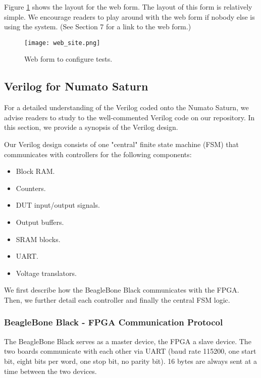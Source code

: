 Figure \ref{fig:web_form} shows the layout for the web form. The layout of this form is relatively simple. We encourage readers to play around with the web form if nobody else is using the system. (See Section 7 for a link to the web form.)

\begin{figure}[!h]
\texttt{[image: web\_site.png]}
\caption{Web form to configure tests.}
\label{fig:web_form}
\end{figure}

\subsection{Verilog for Numato Saturn}
For a detailed understanding of the Verilog coded onto the Numato Saturn, we advise readers to study to the well-commented Verilog code on our repository. In this section, we provide a synopsis of the Verilog design.

Our Verilog design consists of one "central" finite state machine (FSM) that communicates with controllers for the following components: 
\begin{itemize}
	\item Block RAM.
	\item Counters.
	\item DUT input/output signals.
	\item Output buffers.
	\item SRAM blocks.
	\item UART.
	\item Voltage translators.
\end{itemize}

We first describe how the BeagleBone Black communicates with the FPGA. Then, we further detail each controller and finally the central FSM logic.

\subsubsection{BeagleBone Black - FPGA Communication Protocol}
The BeagleBone Black serves as a master device, the FPGA a slave device. The two boards communicate with each other via UART (baud rate 115200, one start bit, eight bits per word, one stop bit, no parity bit). 16 bytes are always sent at a time between the two devices.

